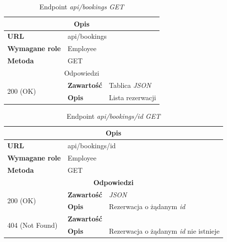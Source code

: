 \documentclass[eng,printmode,openany]{mgr}
\begin{document}
	\begin{table}[H]
		\caption{Endpoint \textit{api/bookings GET}}
		\begin{tabularx}{\textwidth}{|l|l|X|}
			\hline
			\multicolumn{3}{|c|}{\textbf{\textbf{Opis}}}
			\\ \hline
			\textbf{URL}                         & \multicolumn{2}{l|}{api/bookings}
			\\ \hline
			\textbf{Wymagane role}               & \multicolumn{2}{l|}{Employee}
			\\ \hline
			\textbf{Metoda}                      & \multicolumn{2}{l|}{GET}
			\\ \hline
			\multicolumn{3}{|c|}{ Odpowiedzi}
			\\ \hline
			\multirow{2}{*}{200 (OK)}   & \textbf{Zawartość}         & Tablica \textit{JSON}
			\\ \cline{2-3}              & \textbf{Opis}         	    & Lista rezerwacji
			\\ \hline
		\end{tabularx}
	\end{table}
	
	\begin{table}[H]
		\caption{Endpoint \textit{api/bookings/id GET}}
		\begin{tabularx}{\textwidth}{|l|l|X|}
			\hline
			\multicolumn{3}{|c|}{\textbf{\textbf{Opis}}}
			\\ \hline
			\textbf{URL}                         & \multicolumn{2}{l|}{api/bookings/id}
			\\ \hline
			\textbf{Wymagane role}               & \multicolumn{2}{l|}{Employee}
			\\ \hline
			\textbf{Metoda}                      & \multicolumn{2}{l|}{GET}
			\\ \hline
			\multicolumn{3}{|c|}{\textbf{Odpowiedzi}}
			\\ \hline
			\multirow{2}{*}{200 (OK)} 	        & \textbf{Zawartość}   	& \textit{JSON}
			\\ \cline{2-3}                      & \textbf{Opis}         	& Rezerwacja o żądanym \textit{id}
			\\ \hline
			\multirow{2}{*}{404 (Not Found)} 	& \textbf{Zawartość}     & 
			\\ \cline{2-3}                      & \textbf{Opis}          & Rezerwacja o żądanym \textit{id} nie istnieje
			\\ \hline
		\end{tabularx}
	\end{table}
	
\end{document}
